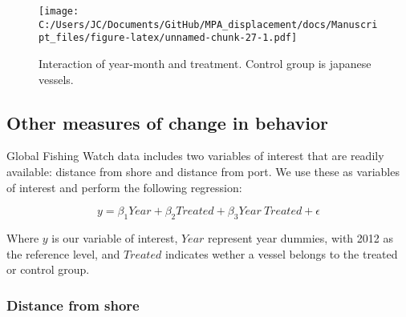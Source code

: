 \documentclass[11pt,]{article}
\begin{document}
\begin{figure}
\centering
\texttt{[image: C:/Users/JC/Documents/GitHub/MPA\_displacement/docs/Manuscript\_files/figure-latex/unnamed-chunk-27-1.pdf]}
\caption{\label{fig:unnamed-chunk-27}\label{fig:ym4}Interaction of
year-month and treatment. Control group is japanese vessels.}
\end{figure}

\hypertarget{other-measures-of-change-in-behavior}{%
\subsection{Other measures of change in
behavior}\label{other-measures-of-change-in-behavior}}

Global Fishing Watch data includes two variables of interest that are
readily available: distance from shore and distance from port. We use
these as variables of interest and perform the following regression:

\[
y = \beta_1Year + \beta_2Treated + \beta_3Year \ Treated + \epsilon
\]

Where \(y\) is our variable of interest, \(Year\) represent year
dummies, with 2012 as the reference level, and \(Treated\) indicates
wether a vessel belongs to the treated or control group.

\clearpage

\hypertarget{distance-from-shore}{%
\subsubsection{Distance from shore}\label{distance-from-shore}}
\end{document}
